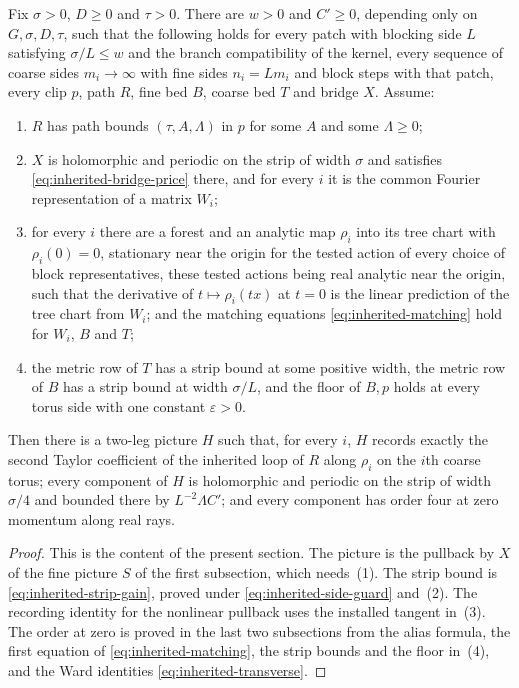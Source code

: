 \begin{proposition}
\label{prop:inherited-loop-picture}
Fix $\sigma>0$, $D\geq0$ and $\tau>0$. There are $w>0$ and $C'\geq0$,
depending only on $G,\sigma,D,\tau$, such that the following holds for
every patch with blocking side $L$ satisfying $\sigma/L\leq w$ and the
branch compatibility of the kernel, every sequence of coarse sides
$m_i\to\infty$ with fine sides $n_i=Lm_i$ and block steps with that
patch, every clip $p$, path $R$, fine bed $B$, coarse bed $T$ and
bridge $X$. Assume:
\begin{enumerate}
\item $R$ has path bounds $(\tau,A,\Lambda)$ in $p$ for some $A$ and
 some $\Lambda\geq0$;
\item $X$ is holomorphic and periodic on the strip of width $\sigma$
 and satisfies \eqref{eq:inherited-bridge-price} there, and for every
 $i$ it is the common Fourier representation of a matrix $W_i$;
\item for every $i$ there are a forest and an analytic map $\rho_i$
 into its tree chart with $\rho_i(0)=0$, stationary near the origin for
 the tested action of every choice of block representatives, these
 tested actions being real analytic near the origin, such that the
 derivative of $t\mapsto\rho_i(tx)$ at $t=0$ is the linear prediction
 of the tree chart from $W_i$; and the matching equations
 \eqref{eq:inherited-matching} hold for $W_i$, $B$ and $T$;
\item the metric row of $T$ has a strip bound at some positive width,
 the metric row of $B$ has a strip bound at width $\sigma/L$, and the
 floor of $B,p$ holds at every torus side with one constant
 $\varepsilon>0$.
\end{enumerate}
Then there is a two-leg picture $H$ such that, for every $i$, $H$
records exactly the second Taylor coefficient of the inherited loop
of $R$ along $\rho_i$ on the $i$th coarse torus; every component of
$H$ is holomorphic and periodic on the strip of width $\sigma/4$ and
bounded there by $L^{-2}\Lambda C'$; and every component has order
four at zero momentum along real rays.
\end{proposition}
\begin{proof}
This is the content of the present section. The picture is the
pullback by $X$ of the fine picture $S$ of the first subsection, which
needs~(1). The strip bound is \eqref{eq:inherited-strip-gain}, proved
under \eqref{eq:inherited-side-guard} and~(2). The recording identity
for the nonlinear pullback uses the installed tangent in~(3). The
order at zero is proved in the last two subsections from the alias
formula, the first equation of \eqref{eq:inherited-matching}, the
strip bounds and the floor in~(4), and the Ward identities
\eqref{eq:inherited-transverse}.
\end{proof}

